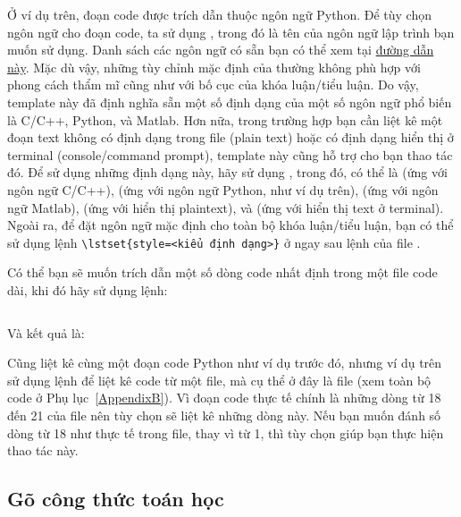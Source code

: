 Ở ví dụ trên, đoạn code được trích dẫn thuộc ngôn ngữ Python. Để tùy chọn ngôn ngữ cho đoạn code, ta sử dụng , trong đó  là tên của ngôn ngữ lập trình bạn muốn sử dụng. Danh sách các ngôn ngữ có sẵn bạn có thể xem tại \href{https://en.wikibooks.org/wiki/LaTeX/Source_Code_Listings#Supported_languages}{đường dẫn này}. Mặc dù vậy, những tùy chỉnh mặc định của  thường không phù hợp với phong cách thẩm mĩ cũng như với bố cục của khóa luận/tiểu luận. Do vậy, template này đã định nghĩa sẵn một số định dạng của một số ngôn ngữ phổ biến là C/C++, Python, và Matlab. Hơn nữa, trong trường hợp bạn cần liệt kê một đoạn text không có định dạng trong file (plain text) hoặc có định dạng hiển thị ở terminal (console/command prompt), template này cũng hỗ trợ cho bạn thao tác đó. Để sử dụng những định dạng này, hãy sử dụng , trong đó,  có thể là  (ứng với ngôn ngữ C/C++),  (ứng với ngôn ngữ Python, như ví dụ trên),  (ứng với ngôn ngữ Matlab),  (ứng với hiển thị plaintext), và  (ứng với hiển thị text ở terminal). Ngoài ra, để đặt ngôn ngữ mặc định cho toàn bộ khóa luận/tiểu luận, bạn có thể sử dụng lệnh \verb|\lstset{style=<kiểu định dạng>}| ở ngay sau lệnh \verb|| của file .
	
Có thể bạn sẽ muốn trích dẫn một số dòng code nhất định trong một file code dài, khi đó hãy sử dụng lệnh:

\begin{Verbatim}

\end{Verbatim}

Và kết quả là:


Cũng liệt kê cùng một đoạn code Python như ví dụ trước đó, nhưng ví dụ trên sử dụng lệnh \verb|| để liệt kê code từ một file, mà cụ thể ở đây là file  (xem toàn bộ code ở Phụ lục~\ref{AppendixB}). Vì đoạn code thực tế chính là những dòng từ 18 đến 21 của file  nên tùy chọn  sẽ liệt kê những dòng này. Nếu bạn muốn đánh số dòng từ 18 như thực tế trong file, thay vì từ 1, thì tùy chọn  giúp bạn thực hiện thao tác này.


\subsection{Gõ công thức toán học}

